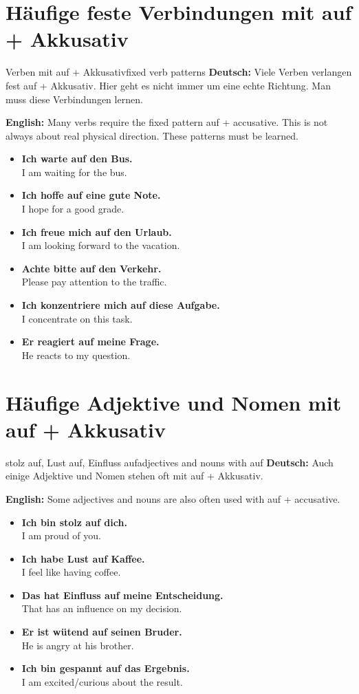 \documentclass[a4paper,11pt]{article}
\newcommand{\GermanText}[1]{\textbf{Deutsch: }#1\par}
\newcommand{\EnglishText}[1]{{\small\color{SoftGray}\textbf{English: }#1\par}}
\newcommand{\ExampleItem}[2]{\item \textbf{#1}\\{\small\color{SoftGray}#2}}
\begin{document}
    \section{Häufige feste Verbindungen mit auf + Akkusativ}

    \begin{grammarentry}{Verben mit auf + Akkusativ}{fixed verb patterns}
        \GermanText{Viele Verben verlangen fest \glqq auf + Akkusativ\grqq. Hier geht es nicht immer um eine echte Richtung. Man muss diese Verbindungen lernen.}
        \EnglishText{Many verbs require the fixed pattern \glqq auf + accusative\grqq. This is not always about real physical direction. These patterns must be learned.}

        \begin{exbox}
            \begin{itemize}
                \ExampleItem{Ich warte auf den Bus.}{I am waiting for the bus.}
                \ExampleItem{Ich hoffe auf eine gute Note.}{I hope for a good grade.}
                \ExampleItem{Ich freue mich auf den Urlaub.}{I am looking forward to the vacation.}
                \ExampleItem{Achte bitte auf den Verkehr.}{Please pay attention to the traffic.}
                \ExampleItem{Ich konzentriere mich auf diese Aufgabe.}{I concentrate on this task.}
                \ExampleItem{Er reagiert auf meine Frage.}{He reacts to my question.}
            \end{itemize}
        \end{exbox}
    \end{grammarentry}

    \section{Häufige Adjektive und Nomen mit auf + Akkusativ}

    \begin{grammarentry}{stolz auf, Lust auf, Einfluss auf}{adjectives and nouns with auf}
        \GermanText{Auch einige Adjektive und Nomen stehen oft mit \glqq auf + Akkusativ\grqq.}
        \EnglishText{Some adjectives and nouns are also often used with \glqq auf + accusative\grqq.}

        \begin{exbox}
            \begin{itemize}
                \ExampleItem{Ich bin stolz auf dich.}{I am proud of you.}
                \ExampleItem{Ich habe Lust auf Kaffee.}{I feel like having coffee.}
                \ExampleItem{Das hat Einfluss auf meine Entscheidung.}{That has an influence on my decision.}
                \ExampleItem{Er ist wütend auf seinen Bruder.}{He is angry at his brother.}
                \ExampleItem{Ich bin gespannt auf das Ergebnis.}{I am excited/curious about the result.}
            \end{itemize}
        \end{exbox}
    \end{grammarentry}
\end{document}
